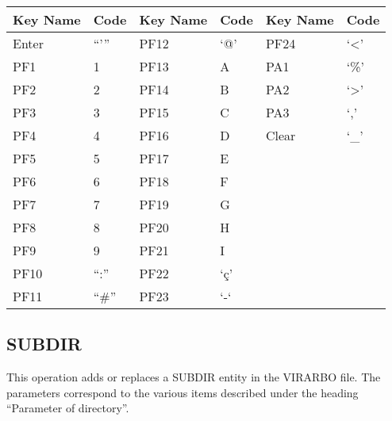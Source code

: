 \documentclass[letterpaper,10pt,english]{sphinxmanual}
\begin{document}
\begin{savenotes}\sphinxattablestart
\centering
\begin{tabulary}{\linewidth}[t]{|T|T|T|T|T|T|}
\hline
\sphinxstyletheadfamily 
Key Name
&\sphinxstyletheadfamily 
Code
&\sphinxstyletheadfamily 
Key Name
&\sphinxstyletheadfamily 
Code
&\sphinxstyletheadfamily 
Key Name
&\sphinxstyletheadfamily 
Code
\\
\hline
Enter
&
“’”
&
PF12
&
‘@’
&
PF24
&
‘\textless{}’
\\
\hline
PF1
&
1
&
PF13
&
A
&
PA1
&
‘\%’
\\
\hline
PF2
&
2
&
PF14
&
B
&
PA2
&
‘\textgreater{}’
\\
\hline
PF3
&
3
&
PF15
&
C
&
PA3
&
‘,’
\\
\hline
PF4
&
4
&
PF16
&
D
&
Clear
&
‘\_’
\\
\hline
PF5
&
5
&
PF17
&
E
&&\\
\hline
PF6
&
6
&
PF18
&
F
&&\\
\hline
PF7
&
7
&
PF19
&
G
&&\\
\hline
PF8
&
8
&
PF20
&
H
&&\\
\hline
PF9
&
9
&
PF21
&
I
&&\\
\hline
PF10
&
“:”
&
PF22
&
‘ç’
&&\\
\hline
PF11
&
“\#”
&
PF23
&
‘-‘
&&\\
\hline
\end{tabulary}
\par
\sphinxattableend\end{savenotes}

\ignorespaces 

\subsection{SUBDIR}
\label{\detokenize{Installation_Guide:subdir}}\label{\detokenize{Installation_Guide:index-173}}
This operation adds or replaces a SUBDIR entity in the VIRARBO file. The parameters correspond to the various items described under the heading “Parameter of directory”.
\end{document}
